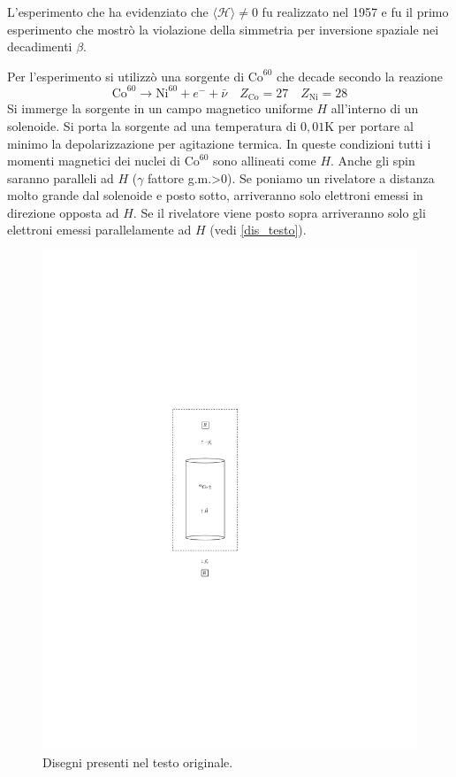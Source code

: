 L'esperimento che ha evidenziato che $\langle\mathcal{H}\rangle\neq 0$ fu realizzato nel 1957 e fu il primo esperimento che mostrò la violazione della simmetria per
inversione spaziale  nei decadimenti $\beta$.

Per l'esperimento si utilizzò una sorgente di $\text{Co}^{60}$ che decade secondo la reazione
\[
  \text{Co}^{60}\rightarrow \text{Ni}^{60}+e^-+\bar{\nu}\quad
  Z_\text{Co}=27\quad Z_\text{Ni}=28
\]
Si immerge la sorgente in un campo magnetico uniforme $H$ all'interno di un solenoide. Si porta la sorgente ad una temperatura di $0,01\si{\kelvin}$ per portare
al minimo la depolarizzazione per agitazione termica. In queste condizioni tutti i momenti magnetici dei nuclei di $\text{Co}^{60}$ sono allineati come $H$.
Anche gli spin saranno paralleli ad $H$ ($\gamma$ fattore g.m.>0).
Se poniamo un rivelatore a distanza molto grande dal solenoide e posto sotto, arriveranno solo elettroni emessi in direzione opposta ad $H$. Se il rivelatore viene posto sopra
arriveranno solo gli elettroni emessi parallelamente ad $H$ (vedi \autoref{dis_testo}).
\begin{figure}[!hbt]
\centering
\caption{Disegni presenti nel testo originale.}
\label{dis_testo}
\includegraphics{img/dis_pboh1}
\end{figure}
